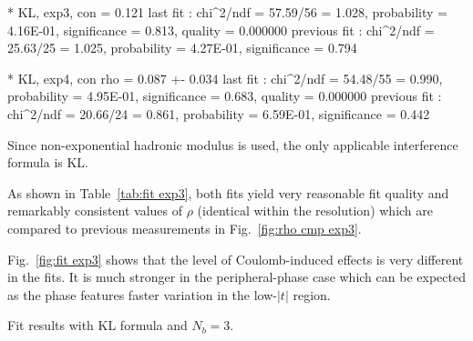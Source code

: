 * KL, exp3, con
\rh       =   0.121 
last fit     : chi^2/ndf = 57.59/56 = 1.028, probability = 4.16E-01, significance = 0.813, quality = 0.000000
previous fit : chi^2/ndf = 25.63/25 = 1.025, probability = 4.27E-01, significance = 0.794

* KL, exp4, con
rho    =   0.087 +-  0.034
last fit     : chi^2/ndf = 54.48/55 = 0.990, probability = 4.95E-01, significance = 0.683, quality = 0.000000
previous fit : chi^2/ndf = 20.66/24 = 0.861, probability = 6.59E-01, significance = 0.442
\fi

Since non-exponential hadronic modulus is used, the only applicable interference formula is KL.

As shown in Table~\ref{tab:fit exp3}, both fits yield very reasonable fit quality and remarkably consistent values of $\rho$ (identical within the resolution) which are compared to previous measurements in Fig.~\ref{fig:rho cmp exp3}.

Fig.~\ref{fig:fit exp3} shows that the level of Coulomb-induced effects is very different in the fits. It is much stronger in the peripheral-phase case which can be expected as the phase features faster variation in the low-$|t|$ region.


\begin{table}
\caption{Fit results with KL formula and $N_b=3$.}
\vskip-3mm
\label{tab:fit exp3}
\begin{center}
\setlength\tabcolsep{5mm}
\small

\end{center}
\end{table}

